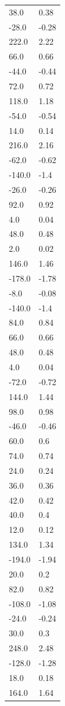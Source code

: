 \begin{longtable}{ll}
38.0 & 0.38 \\
-28.0 & -0.28 \\
222.0 & 2.22 \\
66.0 & 0.66 \\
-44.0 & -0.44 \\
72.0 & 0.72 \\
118.0 & 1.18 \\
-54.0 & -0.54 \\
14.0 & 0.14 \\
216.0 & 2.16 \\
-62.0 & -0.62 \\
-140.0 & -1.4 \\
-26.0 & -0.26 \\
92.0 & 0.92 \\
4.0 & 0.04 \\
48.0 & 0.48 \\
2.0 & 0.02 \\
146.0 & 1.46 \\
-178.0 & -1.78 \\
-8.0 & -0.08 \\
-140.0 & -1.4 \\
84.0 & 0.84 \\
66.0 & 0.66 \\
48.0 & 0.48 \\
4.0 & 0.04 \\
-72.0 & -0.72 \\
144.0 & 1.44 \\
98.0 & 0.98 \\
-46.0 & -0.46 \\
60.0 & 0.6 \\
74.0 & 0.74 \\
24.0 & 0.24 \\
36.0 & 0.36 \\
42.0 & 0.42 \\
40.0 & 0.4 \\
12.0 & 0.12 \\
134.0 & 1.34 \\
-194.0 & -1.94 \\
20.0 & 0.2 \\
82.0 & 0.82 \\
-108.0 & -1.08 \\
-24.0 & -0.24 \\
30.0 & 0.3 \\
248.0 & 2.48 \\
-128.0 & -1.28 \\
18.0 & 0.18 \\
164.0 & 1.64 \\

\end{longtable}
